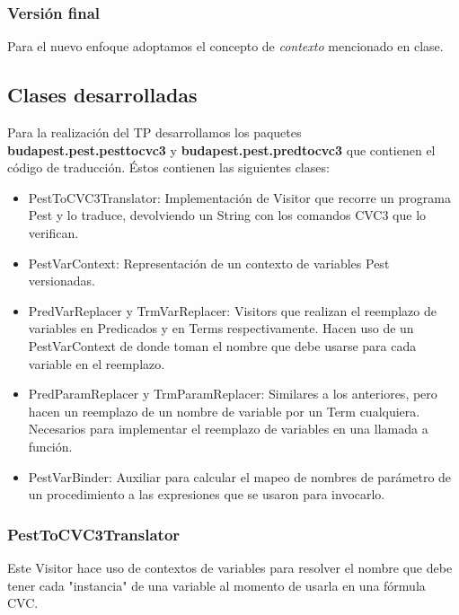 \documentclass{article}
\begin{document}
\subsubsection{Versión final}

Para el nuevo enfoque adoptamos el concepto de \textit{contexto} mencionado en clase. 

\subsection{Clases desarrolladas}

Para la realización del TP desarrollamos los paquetes \textbf{budapest.pest.pesttocvc3} y \textbf{budapest.pest.predtocvc3} que contienen el código de traducción. Éstos contienen las siguientes clases:
\begin{itemize}
\item PestToCVC3Translator: Implementación de Visitor que recorre un programa Pest y lo traduce, devolviendo un String con los comandos CVC3 que lo verifican.
\item PestVarContext: Representación de un contexto de variables Pest versionadas. 
\item PredVarReplacer y TrmVarReplacer: Visitors que realizan el reemplazo de variables en Predicados y en Terms respectivamente. Hacen uso de un PestVarContext de donde toman el nombre que debe usarse para cada variable en el reemplazo.
\item PredParamReplacer y TrmParamReplacer: Similares a los anteriores, pero hacen un reemplazo de un nombre de variable por un Term cualquiera. Necesarios para implementar el reemplazo de variables en una llamada a función.
\item PestVarBinder: Auxiliar para calcular el mapeo de nombres de parámetro de un procedimiento a las expresiones que se usaron para invocarlo.
\end{itemize}

\subsubsection{PestToCVC3Translator}

Este Visitor hace uso de contextos de variables para resolver el nombre que debe tener cada "instancia" de una variable al momento de usarla en una fórmula CVC.
\end{document}
